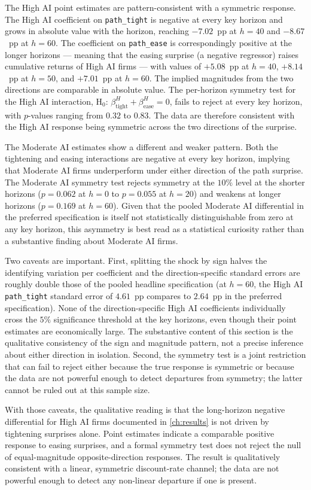 The High AI point estimates are pattern-consistent with a symmetric
response. The High AI coefficient on \texttt{path\_tight} is
negative at every key horizon and grows in absolute value with the
horizon, reaching $-7.02$~pp at $h = 40$ and $-8.67$~pp at $h = 60$.
The coefficient on \texttt{path\_ease} is correspondingly positive
at the longer horizons --- meaning that the easing surprise (a
negative regressor) raises cumulative returns of High AI firms ---
with values of $+5.08$~pp at $h = 40$, $+8.14$~pp at $h = 50$, and
$+7.01$~pp at $h = 60$. The implied magnitudes from the two
directions are comparable in absolute value. The per-horizon
symmetry test for the High AI interaction, H$_0$:
$\beta_{\text{tight}}^{H} + \beta_{\text{ease}}^{H} = 0$, fails to
reject at every key horizon, with $p$-values ranging from $0.32$ to
$0.83$. The data are therefore consistent with the High AI response
being symmetric across the two directions of the surprise.

The Moderate AI estimates show a different and weaker pattern. Both
the tightening and easing interactions are negative at every key
horizon, implying that Moderate AI firms underperform under either
direction of the path surprise. The Moderate AI symmetry test
rejects symmetry at the $10\%$ level at the shorter horizons ($p =
0.062$ at $h = 0$ to $p = 0.055$ at $h = 20$) and weakens at longer
horizons ($p = 0.169$ at $h = 60$). Given that the pooled Moderate
AI differential in the preferred specification is itself not
statistically distinguishable from zero at any key horizon, this
asymmetry is best read as a statistical curiosity rather than a
substantive finding about Moderate AI firms.

Two caveats are important. First, splitting the shock by sign halves
the identifying variation per coefficient and the direction-specific
standard errors are roughly double those of the pooled headline
specification (at $h = 60$, the High AI \texttt{path\_tight} standard
error of $4.61$~pp compares to $2.64$~pp in the preferred
specification). None of the direction-specific High AI coefficients
individually cross the $5\%$ significance threshold at the key
horizons, even though their point estimates are economically large.
The substantive content of this section is the qualitative
consistency of the sign and magnitude pattern, not a precise
inference about either direction in isolation. Second, the symmetry
test is a joint restriction that can fail to reject either because
the true response is symmetric or because the data are not powerful
enough to detect departures from symmetry; the latter cannot be
ruled out at this sample size.

With those caveats, the qualitative reading is that the long-horizon
negative differential for High AI firms documented in
\cref{ch:results} is not driven by tightening surprises alone. Point
estimates indicate a comparable positive response to easing
surprises, and a formal symmetry test does not reject the null of
equal-magnitude opposite-direction responses. The result is
qualitatively consistent with a linear, symmetric discount-rate
channel; the data are not powerful enough to detect any non-linear
departure if one is present.